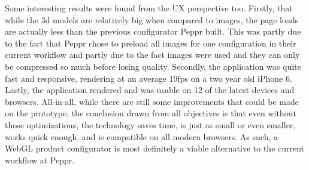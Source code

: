 Some interesting results were found from the UX perspective too. Firstly, that while the 3d models are relatively big when compared to images, the page loads are actually less than the previous configurator Peppr built. This was partly due to the fact that Peppr chose to preload all images for one configuration in their current workflow and partly due to the fact images were used and they can only be compressed so much before losing quality. Secondly, the application was quite fast and responsive, rendering at an average 19fps on a two year old iPhone 6. Lastly, the application rendered and was usable on 12 of the latest devices and browsers. \newline
All-in-all, while there are still some improvements that could be made on the prototype, the conclusion drawn from all objectives is that even without those optimizations, the technology saves time, is just as small or even smaller, works quick enough, and is compatible on all modern browsers. As such, a WebGL product configurator is most definitely a viable alternative to the current workflow at Peppr.